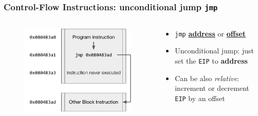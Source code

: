 \documentclass[]{beamer}
\begin{document}
\begin{frame}
  \frametitle{Control-Flow Instructions: unconditional jump {\tt jmp}}
  \begin{columns}
    \begin{column}{0.4\columnwidth}
      \begin{figure}
        \includegraphics[width=1.1\textwidth]{images/x86-jmp.pdf}

        \label{Control Flow JMP}
      \end{figure}
    \end{column}
    \begin{column}{0.6\columnwidth}
      \begin{itemize}
	      \item{{\tt jmp} \underline{\textbf{address}} or \underline{\textbf{offset}}}\\
	      \item Unconditional jump: just set the {\tt EIP} to \textbf{address}
	      \item Can be also \emph{relative}: increment or decrement {\tt EIP} by an offset
      \end{itemize}
    \end{column}
  \end{columns}
\end{frame}
\end{document}

